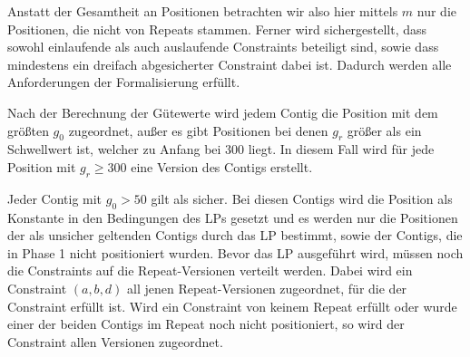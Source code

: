 Anstatt der Gesamtheit an Positionen betrachten wir also hier mittels $m$ nur die Positionen, die nicht von Repeats stammen.
Ferner wird sichergestellt, dass sowohl einlaufende als auch auslaufende Constraints beteiligt sind, sowie dass mindestens ein dreifach abgesicherter Constraint dabei ist. 
Dadurch werden alle Anforderungen der Formalisierung erfüllt.

Nach der Berechnung der Gütewerte wird jedem Contig die Position mit dem größten $g_0$ zugeordnet, außer es gibt Positionen bei denen $g_r$ größer als ein Schwellwert ist, welcher zu Anfang bei 300 liegt. In diesem Fall wird für jede Position mit $g_r \geq 300$ eine Version des Contigs erstellt.

Jeder Contig mit $g_0 > 50$ gilt als sicher. Bei diesen Contigs wird die Position als Konstante in den Bedingungen des LPs gesetzt und es werden nur die Positionen der als unsicher geltenden Contigs durch das LP bestimmt, sowie der Contigs, die in Phase 1 nicht positioniert wurden. Bevor das LP ausgeführt wird, müssen noch die Constraints auf die Repeat-Versionen verteilt werden. 
Dabei wird ein Constraint $(a,b,d)$ all jenen Repeat-Versionen zugeordnet, für die der Constraint erfüllt ist. Wird ein Constraint von keinem Repeat erfüllt oder wurde einer der beiden Contigs im Repeat noch nicht positioniert, so wird der Constraint allen Versionen zugeordnet.


